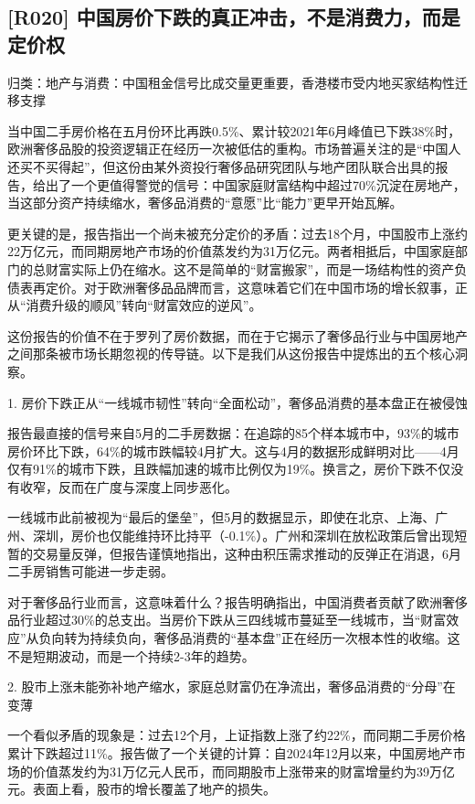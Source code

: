\documentclass[11pt]{ctexart}
\begin{document}
\subsection{[R020] 中国房价下跌的真正冲击，不是消费力，而是定价权}
{\small\color{refgray}归类：地产与消费：中国租金信号比成交量更重要，香港楼市受内地买家结构性迁移支撑}

当中国二手房价格在五月份环比再跌0.5\%、累计较2021年6月峰值已下跌38\%时，欧洲奢侈品股的投资逻辑正在经历一次被低估的重构。市场普遍关注的是“中国人还买不买得起”，但这份由某外资投行奢侈品研究团队与地产团队联合出具的报告，给出了一个更值得警觉的信号：中国家庭财富结构中超过70\%沉淀在房地产，当这部分资产持续缩水，奢侈品消费的“意愿”比“能力”更早开始瓦解。

更关键的是，报告指出一个尚未被充分定价的矛盾：过去18个月，中国股市上涨约22万亿元，而同期房地产市场的价值蒸发约为31万亿元。两者相抵后，中国家庭部门的总财富实际上仍在缩水。这不是简单的“财富搬家”，而是一场结构性的资产负债表再定价。对于欧洲奢侈品品牌而言，这意味着它们在中国市场的增长叙事，正从“消费升级的顺风”转向“财富效应的逆风”。

这份报告的价值不在于罗列了房价数据，而在于它揭示了奢侈品行业与中国房地产之间那条被市场长期忽视的传导链。以下是我们从这份报告中提炼出的五个核心洞察。

1. 房价下跌正从“一线城市韧性”转向“全面松动”，奢侈品消费的基本盘正在被侵蚀

报告最直接的信号来自5月的二手房数据：在追踪的85个样本城市中，93\%的城市房价环比下跌，64\%的城市跌幅较4月扩大。这与4月的数据形成鲜明对比——4月仅有91\%的城市下跌，且跌幅加速的城市比例仅为19\%。换言之，房价下跌不仅没有收窄，反而在广度与深度上同步恶化。

一线城市此前被视为“最后的堡垒”，但5月的数据显示，即使在北京、上海、广州、深圳，房价也仅能维持环比持平（-0.1\%）。广州和深圳在放松政策后曾出现短暂的交易量反弹，但报告谨慎地指出，这种由积压需求推动的反弹正在消退，6月二手房销售可能进一步走弱。

对于奢侈品行业而言，这意味着什么？报告明确指出，中国消费者贡献了欧洲奢侈品行业超过30\%的总支出。当房价下跌从三四线城市蔓延至一线城市，当“财富效应”从负向转为持续负向，奢侈品消费的“基本盘”正在经历一次根本性的收缩。这不是短期波动，而是一个持续2-3年的趋势。

2. 股市上涨未能弥补地产缩水，家庭总财富仍在净流出，奢侈品消费的“分母”在变薄

一个看似矛盾的现象是：过去12个月，上证指数上涨了约22\%，而同期二手房价格累计下跌超过11\%。报告做了一个关键的计算：自2024年12月以来，中国房地产市场的价值蒸发约为31万亿元人民币，而同期股市上涨带来的财富增量约为39万亿元。表面上看，股市的增长覆盖了地产的损失。
\end{document}
